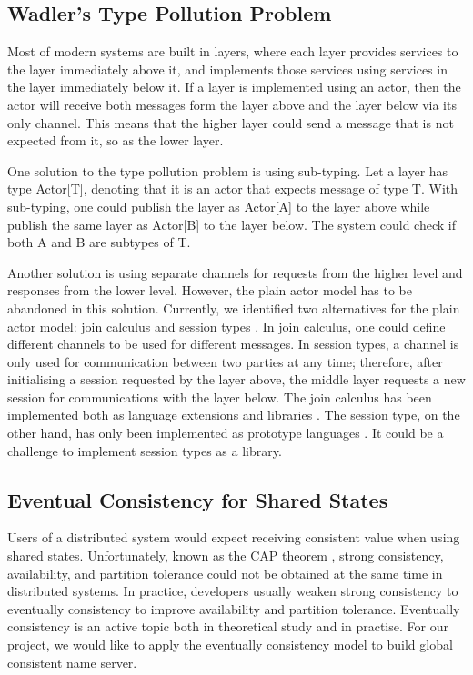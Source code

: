 

\subsection{Wadler's Type Pollution Problem}
\label{type_pollution}
Most of modern systems are built in layers, where each layer provides services to the layer immediately above it, and implements those services using services in the layer immediately below it.  If a layer is implemented using an actor, then the actor will receive both messages form the layer above and the layer below via its only channel.  This means that the higher layer could send a message that is not expected from it, so as the lower layer.

One solution to the type pollution problem is using sub-typing.  Let a layer has type Actor[T], denoting that it is an actor that expects message of type T.  With sub-typing, one could publish the layer as Actor[A] to the layer above while publish the same layer as Actor[B] to the layer below.  The system could check if both A and B are subtypes of T.

Another solution is using separate channels for requests from the higher level and responses from the lower level.  However, the plain actor model has to be abandoned in this solution.  Currently, we identified two alternatives for the plain actor model: join calculus \cite{full_join} and session types \cite{Honda93typesfor, Honda_languageprimitives}.  In join calculus, one could define different channels to be used for different messages.  In session types, a channel is only used for communication between two parties at any time; therefore, after initialising a session requested by the layer above, the middle layer requests a new session for communications with the layer below.  The join calculus has been implemented both as language extensions \cite{join_csharp} and libraries \cite{scala_joins, join-fsharp, Russo07thejoins}.  The session type, on the other hand, has only been implemented as prototype languages \cite{Honda_languageprimitives, SJ}.  It could be a challenge to implement session types as a library.


\subsection{Eventual Consistency for Shared States}
Users of a distributed system would expect receiving consistent value when using shared states. Unfortunately, known as the CAP theorem \cite{CAP}, strong consistency, availability, and partition tolerance could not be obtained at the same time in distributed systems.  In practice, developers usually weaken strong consistency to eventually consistency to improve availability and partition tolerance.  Eventually consistency is an active topic both in theoretical study\cite{Eventually_Consistent_Transactions, Vogels_2009} and in practise\cite{Dynamo}.  For our project, we would like to apply the eventually consistency model to build global consistent name server.

